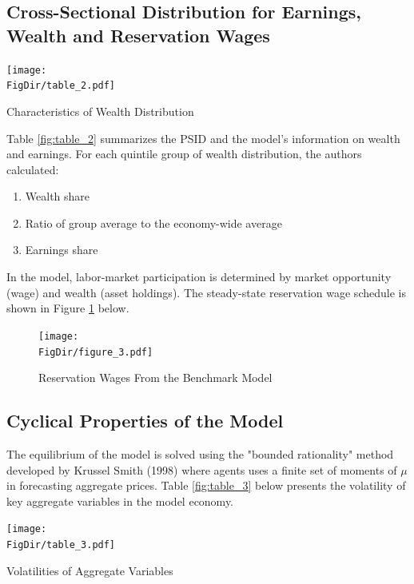 \documentclass[titlepage,letterpaper]{\econtex}
\begin{document}
  \subsection{Cross-Sectional Distribution for Earnings, Wealth and Reservation Wages}\label{sec:CrossSectional}

       \begin{table}[H]
    {\centering \texttt{[image: \\FigDir/table\_2.pdf]}}
    \caption{Characteristics of Wealth Distribution}
    \label{fig:table_2}
  \end{table}
  
Table \ref{fig:table_2}  summarizes the PSID and the model's information on wealth and earnings. For each quintile group of wealth distribution, the authors calculated:

\begin{enumerate}
\item Wealth share
\item Ratio of group average to the  economy-wide average
\item Earnings share
\end{enumerate}

In the model, labor-market participation is determined by market opportunity (wage) and wealth (asset holdings). The steady-state reservation wage schedule is shown in Figure \ref{fig:figure_3}  below.

\begin{figure}[H]
  \centering
    \texttt{[image: \\FigDir/figure\_3.pdf]}
  \caption{Reservation Wages From the Benchmark Model}
    \label{fig:figure_3}
  \end{figure}


\subsection{Cyclical Properties of the Model}\label{sec:CyclicalProperties}

The equilibrium of the model is solved using the "bounded rationality" method developed by Krussel Smith (1998) where agents uses a finite set of moments of $\mu$ in forecasting aggregate prices. Table \ref{fig:table_3}  below presents the volatility of key aggregate variables in the model economy.

       \begin{table}[H]
         \centering
         \texttt{[image: \\FigDir/table\_3.pdf]}
         \caption{Volatilities of Aggregate Variables}
    \label{fig:table_3}
  \end{table}
  
\end{document}
